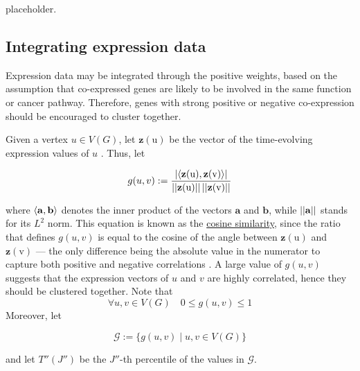 placeholder. 

\subsection{Integrating expression data}

Expression data may be integrated through the positive weights, based on the assumption that co-expressed genes are likely to be involved in the same function or cancer pathway. Therefore, genes with strong positive or negative co-expression should be encouraged to cluster together.

Given a vertex $u \in V(G)$, let $\mathrm {\mathbf z(u)}$ be the vector of the time-evolving expression values of $u$ . Thus, let

\begin{equation}
    g(u, v) := \dfrac{\left|\left\langle\mathrm{\mathbf z(u)}, \mathrm{\mathbf z(v)}\right\rangle\right|}{\left|\left|\mathrm{\mathbf z(u)}\right|\right| \left|\left|\mathrm{\mathbf z(v)}\right|\right|}
\end{equation}

where $\left\langle\mathrm{\mathbf a}, \mathrm{\mathbf b}\right\rangle$ denotes the inner product of the vectors $\mathrm{\mathbf a}$ and $\mathrm{\mathbf b}$, while $\left|\left|\mathrm{\mathbf a}\right|\right|$ stands for its $L^2$ norm. This equation is known as the \href{https://en.wikipedia.org/wiki/Cosine_similarity}{cosine similarity}, since the ratio that defines $g(u, v)$ is equal to the cosine of the angle between $\mathrm {\mathbf z(u)}$ and $\mathrm {\mathbf z(v)}$ --- the only difference being the absolute value in the numerator to capture both positive and negative correlations . A large value of $g(u, v)$ suggests that the expression vectors of $u$ and $v$ are highly correlated, hence they should be clustered together. Note that $$\forall u, v \in V(G) \quad 0 \le g(u, v) \le 1$$ Moreover, let

\begin{equation}
    \mathscr G := \{g(u, v) \mid u, v \in V(G)\}
\end{equation}

and let $T''(J'')$ be the $J''$-th percentile of the values in $\mathscr G$.

